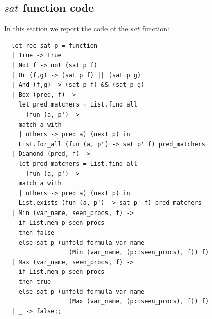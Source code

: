 \subsection{$sat$ function code}
\label{subsec:sat-function-code}
In this section we report the code of the $sat$ function:
\lstset{language=Caml} 
\begin{lstlisting}
  let rec sat p = function
  | True -> true
  | Not f -> not (sat p f)
  | Or (f,g) -> (sat p f) || (sat p g)
  | And (f,g) -> (sat p f) && (sat p g)
  | Box (pred, f) ->
    let pred_matchers = List.find_all
      (fun (a, p') ->
	match a with
	| others -> pred a) (next p) in
    List.for_all (fun (a, p') -> sat p' f) pred_matchers
  | Diamond (pred, f) ->
    let pred_matchers = List.find_all
      (fun (a, p') ->
	match a with
	| others -> pred a) (next p) in
    List.exists (fun (a, p') -> sat p' f) pred_matchers
  | Min (var_name, seen_procs, f) ->
    if List.mem p seen_procs
    then false
    else sat p (unfold_formula var_name
                  (Min (var_name, (p::seen_procs), f)) f)
  | Max (var_name, seen_procs, f) ->
    if List.mem p seen_procs
    then true
    else sat p (unfold_formula var_name
                  (Max (var_name, (p::seen_procs), f)) f)
  | _ -> false;;
\end{lstlisting}